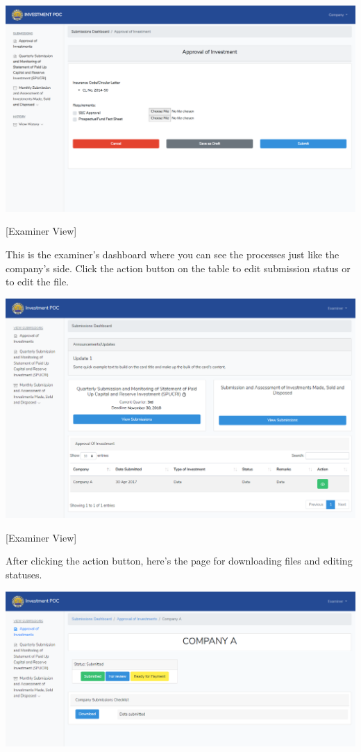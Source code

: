 \documentclass{article}
\begin{document}
\includegraphics[keepaspectratio=true]{up-ic-screens/image90}{}%

[Examiner View]%

This is the examiner’s dashboard where you can see the
processes just like the company’s side. Click the action button on the
table to edit submission status or to edit the file.%

\includegraphics[keepaspectratio=true]{up-ic-screens/image44}{}%

[Examiner View]%

After clicking the action button, here’s the page for
downloading files and editing statuses.%

\includegraphics[keepaspectratio=true]{up-ic-screens/image3}{}%
\end{document}
